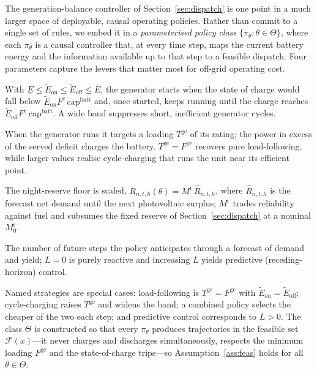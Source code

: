 \documentclass[11pt,a4paper]{article}
\theoremstyle{plain}
\theoremstyle{definition}
\begin{document}
The generation-balance controller of Section~\ref{sec:dispatch} is one point in a much
larger space of deployable, causal operating policies. Rather than commit to a single set
of rules, we embed it in a \emph{parameterised policy class}
$\{\pi_\theta : \theta\in\Theta\}$, where each $\pi_\theta$ is a causal controller that,
at every time step, maps the current battery energy and the information available up to
that step to a feasible dispatch. Four parameters capture the levers that matter most for
off-grid operating cost.
\begin{description}[leftmargin=1.9em,style=nextline]
  \item[Commitment hysteresis $(\tilde E_{\mathrm{on}},\tilde E_{\mathrm{off}})$.] With
  $\underline{E}\le\tilde E_{\mathrm{on}}\le\tilde E_{\mathrm{off}}\le\overline E$, the
  generator starts when the state of charge would fall below
  $\tilde E_{\mathrm{on}}F^{e}\,\mathrm{cap}^{\mathrm{batt}}$ and, once started, keeps
  running until the charge reaches $\tilde E_{\mathrm{off}}F^{e}\,\mathrm{cap}^{\mathrm{batt}}$.
  A wide band suppresses short, inefficient generator cycles.
  \item[{Generator setpoint $T^{\mathrm{ge}}\in[F^{\mathrm{ge}},1]$.}] When the
  generator runs it targets a loading $T^{\mathrm{ge}}$ of its rating; the power in
  excess of the served deficit charges the battery. $T^{\mathrm{ge}}=F^{\mathrm{ge}}$
  recovers pure load-following, while larger values realise cycle-charging that runs the
  unit near its efficient point.
  \item[Reserve multiplier $M^{\mathrm{r}}\ge0$.] The night-reserve floor is scaled,
  $R_{n,t,h}(\theta)=M^{\mathrm{r}}\,\hat R_{n,t,h}$, where $\hat R_{n,t,h}$ is the forecast net
  demand until the next photovoltaic surplus; $M^{\mathrm{r}}$ trades reliability against fuel and
  subsumes the fixed reserve of Section~\ref{sec:dispatch} at a nominal $M^{\mathrm{r}}_0$.
  \item[Look-ahead horizon $L\ge0$.] The number of future steps the policy anticipates
  through a forecast of demand and yield; $L=0$ is purely reactive and increasing $L$
  yields predictive (receding-horizon) control.
\end{description}
Named strategies are special cases: load-following is
$T^{\mathrm{ge}}=F^{\mathrm{ge}}$ with $\tilde E_{\mathrm{on}}=\tilde E_{\mathrm{off}}$;
cycle-charging raises $T^{\mathrm{ge}}$ and widens the band; a combined policy selects
the cheaper of the two each step; and predictive control corresponds to $L>0$. The class
$\Theta$ is constructed so that every $\pi_\theta$ produces trajectories in the feasible
set $\mathcal{F}(x)$---it never charges and discharges simultaneously, respects the
minimum loading $F^{\mathrm{ge}}$ and the state-of-charge trips---so
Assumption~\ref{ass:feas} holds for all $\theta\in\Theta$.
\end{document}
